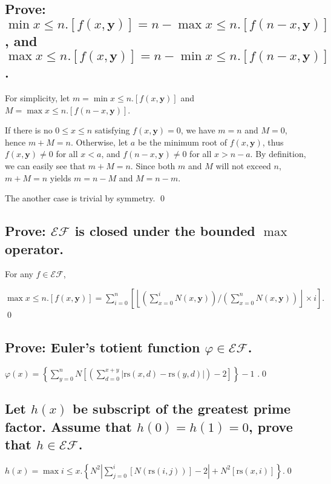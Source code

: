 \documentclass[11pt]{article}
\newcommand{\EF}{\mathcal{EF}}
\begin{document}
\subsection{Prove: $\min x\leq n.[f(x,\mathbf{y})] = n - \max x \leq n.[f(n - x,\mathbf{y})]$,
and $\max x\leq n.[f(x,\mathbf{y})] = n - \min x \leq n.[f(n - x,\mathbf{y})]$.}

\begin{pf} \rm
 For simplicity, let $m=\min x\leq n.[f(x,\mathbf{y})]$ and $M=\max x\leq n.[f(n - x,\mathbf{y})]$.

If there is no $0\leq x\leq n$ satisfying $f(x,\mathbf{y})=0$, we have $m=n$ and $M=0$, hence
$m + M = n$. Otherwise, let $a$ be the minimum root of $f(x, \mathbf{y})$, thus 
$f(x, \mathbf{y})\neq 0$ for all $x<a$, and  $f(n - x, \mathbf{y})\neq 0$ for all $x > n - a$.
By definition, we can easily see that $m+M=n$. Since both $m$ and $M$ will not exceed $n$, 
$m+M=n$ yields $m = n - M$ and $M = n - m$. 

The another case is trivial by symmetry. \qed
\end{pf}

\subsection{Prove: $\mathcal{EF}$ is closed under the bounded $\max$ operator.}

\begin{pf} \rm For any $f \in \EF$,

\noindent
$\displaystyle \max x \leq n.[f(x,\mathbf{y})]
= \sum_{i=0}^{n} \left[ \left\lfloor
  \left( \sum_{x=0}^{i} N(x, \mathbf{y}) \right)
   /
  \left( \sum_{x=0}^{n} N(x, \mathbf{y}) \right) \right\rfloor
  \times i
\right].
$ \qed
\end{pf}

\subsection{Prove: Euler's totient function $\varphi\in\EF$.}
\begin{pf} \rm
 $\displaystyle \varphi(x) = 
\left\{ \sum_{y=0}^{n} N\left[
\left( \sum_{d=0}^{x+y} \Big| \mathrm{rs}(x, d) - \mathrm{rs}(y, d)\Big| \right) - 2  \right]
\right\}
- 1$ .\qed
\end{pf}

\subsection{Let $h(x)$ be subscript of the greatest prime factor. Assume that $h(0) = h(1)=0$,
prove that $h\in\EF$.}
\begin{pf} \rm
$\displaystyle h(x) = \max i\leq x. \left\{
N^2\left| \sum_{j = 0}^{i} [N(\mathrm{rs}(i, j))] - 2 \right|
+ N^2[\mathrm{rs}(x, i)] \right\}
$.\qed
\end{pf}
\end{document}
